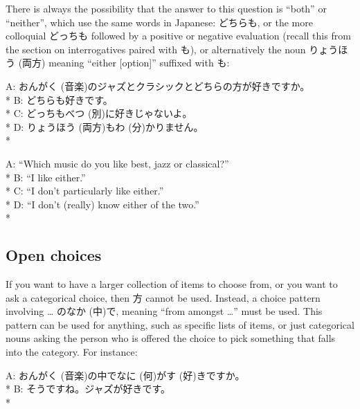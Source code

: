 \documentclass[11pt, b5paper, twoside, openright, onecolumn]{book}
\makeatletter
\newcommand*{\rubystack}[2]{{\relscale{0.5}%
  \begin{tabular}[b]{@{}c@{}}%
    {#1}\\%
   {\textscale{2}{#2}}%
  \end{tabular}}%
}
\DeclareRobustCommand*{\ruby}[2]{%
  \mbox{%
    \setlength{\parskip}{0ex}%
    \BeginAccSupp{method=pdfstringdef,ActualText={#1}}%
      \rubystack{\phantom{#2}}{#1}%
      \llap{%
        \rubystack{#2}{\phantom{#1}}%
      }%
    \EndAccSupp{}%
  }%
}
\renewcommand*{\ruby}[2]{#2 (#1)}%
\newenvironment{exampleblock}{
\setlength{\parindent}{0.6in}
\begin{minipage}[t]{\dimexpr\textwidth-\parindent}}
{\end{minipage}}
\makeatother
\begin{document}
There is always the possibility that the answer to this question is “both” or “neither”‚ which use the same words in Japanese: どちらも‚ or the more colloquial どっちも followed by a positive or negative evaluation (recall this from the section on interrogatives paired with も)‚ or alternatively the noun \ruby{両方}{りょうほう} meaning “either [option]” suffixed with も:

\vspace{0.4cm}
\begin{exampleblock}
A: \ruby{音楽}{おんがく}のジャズとクラシックとどちらの方が好きですか。 \\* 
B: どちらも好きです。 \\* 
C: どっちも\ruby{別}{べつ}に好きじゃないよ。 \\* 
D: \ruby{両方}{りょうほう}も\ruby{分}{わ}かりません。 \\* 
\end{exampleblock}
\vspace{0.2cm}

\begin{exampleblock}
A: “Which music do you like best‚ jazz or classical?” \\* 
B: “I like either.” \\* 
C: “I don’t particularly like either.” \\* 
D: “I don’t (really) know either of the two.” \\* 
\end{exampleblock}
\subsection{Open choices}


If you want to have a larger collection of items to choose from‚ or you want to ask a categorical choice‚ then 方 cannot be used. Instead‚ a choice pattern involving … の\ruby{中}{なか}で‚ meaning “from amongst …” must be used. This pattern can be used for anything‚ such as specific lists of items‚ or just categorical nouns asking the person who is offered the choice to pick something that falls into the category. For instance:

\vspace{0.4cm}
\begin{exampleblock}
A: \ruby{音楽}{おんがく}の中で\ruby{何}{なに}が\ruby{好}{す}きですか。 \\* 
B: そうですね。ジャズが好きです。 \\* 
\end{exampleblock}
\vspace{0.2cm}
\end{document}
